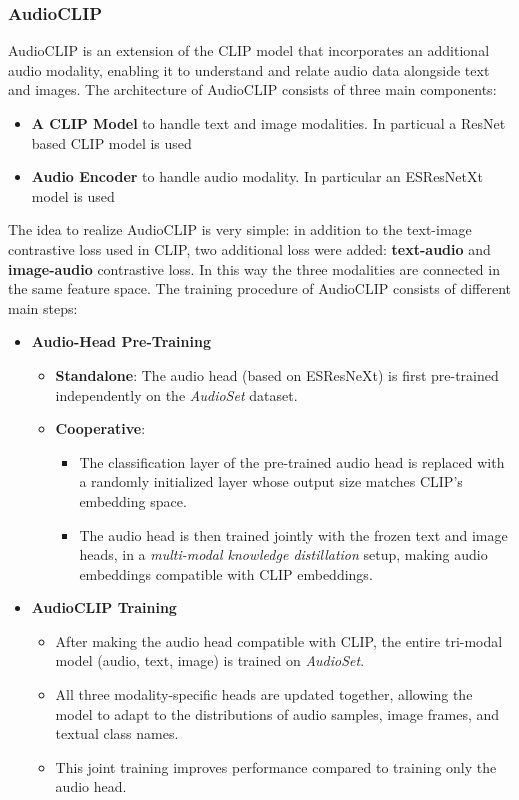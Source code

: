 \subsubsection{AudioCLIP}
\label{sec:AudioClip}
AudioCLIP \cite{AudioCLIP} is an extension of the CLIP model that incorporates an additional audio modality, enabling it to understand and relate audio data alongside text and images. The architecture of AudioCLIP consists of three main components:
\begin{itemize}
    \item \textbf{A CLIP Model} to handle text and image modalities. In particual a ResNet based CLIP model is used
    \item \textbf{Audio Encoder} to handle audio modality. In particular an ESResNetXt model is used
\end{itemize}
The idea to realize AudioCLIP is very simple: in addition to the text-image contrastive loss used in CLIP, two additional loss were added: \textbf{text-audio} and \textbf{image-audio} contrastive loss. In this way the three modalities are connected in the same feature space. The training procedure of AudioCLIP consists of different main steps:
\begin{itemize}
    \item \textbf{Audio-Head Pre-Training}  
    \begin{itemize}
        \item \textbf{Standalone}: The audio head (based on ESResNeXt) is first pre-trained independently on the \textit{AudioSet} dataset.  
        \item \textbf{Cooperative}:  
        \begin{itemize}
            \item The classification layer of the pre-trained audio head is replaced with a randomly initialized layer whose output size matches CLIP’s embedding space.  
            \item The audio head is then trained jointly with the frozen text and image heads, in a \textit{multi-modal knowledge distillation} setup, making audio embeddings compatible with CLIP embeddings.
        \end{itemize}
    \end{itemize}

    \item \textbf{AudioCLIP Training}  
    \begin{itemize}
        \item After making the audio head compatible with CLIP, the entire tri-modal model (audio, text, image) is trained on \textit{AudioSet}.  
        \item All three modality-specific heads are updated together, allowing the model to adapt to the distributions of audio samples, image frames, and textual class names.  
        \item This joint training improves performance compared to training only the audio head.
    \end{itemize}
\end{itemize}


